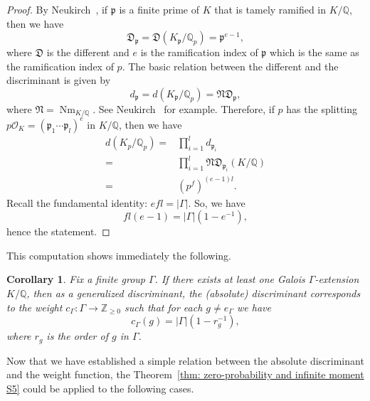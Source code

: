 \documentclass[12pt,a4paper]{amsart}
\numberwithin{equation}{section}%
\theoremstyle{plain}%
\newtheorem{corollary}[theorem]{Corollary}%
\theoremstyle{definition}%
\theoremstyle{remark}%
\begin{document}
    \begin{proof}
    	By Neukirch~\cite[(3.2.6)]{neukirch2013algebraic}, if $\mathfrak{p}$ is a finite prime of $K$ that is tamely ramified in $K/\mathbb{Q}$, then we have
    	\begin{equation*}
    		\mathfrak{D}_{\mathfrak{p}}=\mathfrak{D}(K_{\mathfrak{p}}/\mathbb{Q}_{p})=\mathfrak{p}^{e-1},%
    	\end{equation*}
    	where $\mathfrak{D}$ is the different and $e$ is the ramification index of $\mathfrak{p}$ which is the same as the ramification index of $p$.
    	The basic relation between the different and the discriminant is given by
    	\begin{equation*}
    		d_{\mathfrak{p}}=d(K_{\mathfrak{p}}/\mathbb{Q}_{p})=\mathfrak{ND}_{\mathfrak{p}},%
    	\end{equation*}
    	where $\mathfrak{N}=\operatorname{Nm}_{K/\mathbb{Q}}$.
    	See Neukirch~\cite[(3.2.9), (3.2.11)]{neukirch2013algebraic} for example.
    	Therefore, if $p$ has the splitting $p\mathcal{O}_{K}=(\mathfrak{p}_{1}\cdots\mathfrak{p}_{l})^{e}$ in $K/\mathbb{Q}$, then we have
    	\begin{align*}
    		d(K_{p}/\mathbb{Q}_{p})=&\prod_{i=1}^{l}d_{\mathfrak{p}_{i}}\\%
    		=&\prod_{i=1}^{l}\mathfrak{ND}_{\mathfrak{p}_{i}}(K/\mathbb{Q})\\%
    		=&(p^{f})^{(e-1)l}.%
    	\end{align*}
    	Recall the fundamental identity: $efl=\lvert\Gamma\rvert$.
    	So, we have
    	\begin{equation*}
    		fl(e-1)=\lvert\Gamma\rvert(1-e^{-1}),%
    	\end{equation*}
    	hence the statement.
    \end{proof}
    This computation shows immediately the following.
    \begin{corollary}
    	Fix a finite group $\Gamma$.
    	If there exists at least one Galois $\Gamma$-extension $K/\mathbb{Q}$, then as a generalized discriminant, the (absolute) discriminant corresponds to the weight $c_{\Gamma}:\Gamma\to\mathbb{Z}_{\geq0}$ such that for each $g\neq e_{\Gamma}$ we have
    	\begin{equation*}
    		c_{\Gamma}(g)=\lvert\Gamma\rvert(1-r_{g}^{-1}),%
    	\end{equation*}
    	where $r_{g}$ is the order of $g$ in $\Gamma$.
    \end{corollary}
    Now that we have established a simple relation between the absolute discriminant and the weight function, the Theorem~\ref{thm: zero-probability and infinite moment S5} could be applied to the following cases.
\end{document}

